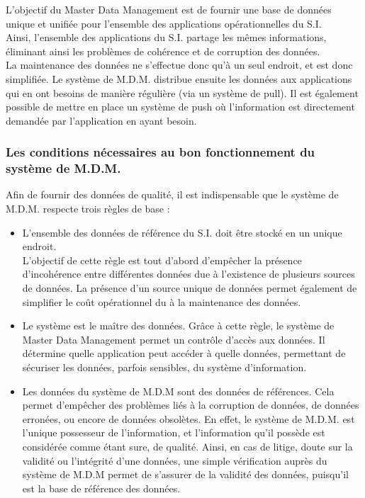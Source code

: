 L'objectif du Master Data Management est de fournir une base de données unique et unifiée  pour l'ensemble des applications opérationnelles du S.I.\\
Ainsi, l'ensemble des applications du S.I. partage les mêmes informations, éliminant ainsi les problèmes de cohérence et de corruption des données.\\
La maintenance des données ne s'effectue donc qu'à un seul endroit, et est donc simplifiée. Le système de M.D.M. distribue ensuite les données aux applications qui en ont besoins de manière régulière (via un système de pull). Il est également possible de mettre en place un système de push où l'information est directement demandée par l'application en ayant besoin.

\subsubsection{Les conditions nécessaires au bon fonctionnement du système de M.D.M.}

Afin de fournir des données de qualité, il est indispensable que le système de M.D.M. respecte trois règles de base :

\begin{itemize}

\item
L'ensemble des données de référence du S.I. doit être stocké en un unique endroit.\\
L'objectif de cette règle est tout d'abord d'empêcher la présence d'incohérence entre différentes données due à l'existence de plusieurs sources de données. La présence d'un source unique de données permet également de simplifier le coût opérationnel du à la maintenance des données.

\item
Le système est le maître des données. Grâce à cette règle, le système de Master Data Management permet un contrôle d'accès aux données. Il détermine quelle application peut accéder à quelle données, permettant de sécuriser les données, parfois sensibles, du système d'information.

\item Les données du système de M.D.M sont des données de références. Cela permet d'empêcher des problèmes liés à la corruption de données, de données erronées, ou encore de données obsolètes. En effet, le système de M.D.M. est l'unique possesseur de l'information, et l'information qu'il possède est considérée comme étant sure, de qualité. Ainsi, en cas de litige, doute sur la validité ou l'intégrité d'une données, une simple vérification auprès du système de M.D.M permet de s'assurer de la validité des données, puisqu'il est la base de référence des données.

\end{itemize}

